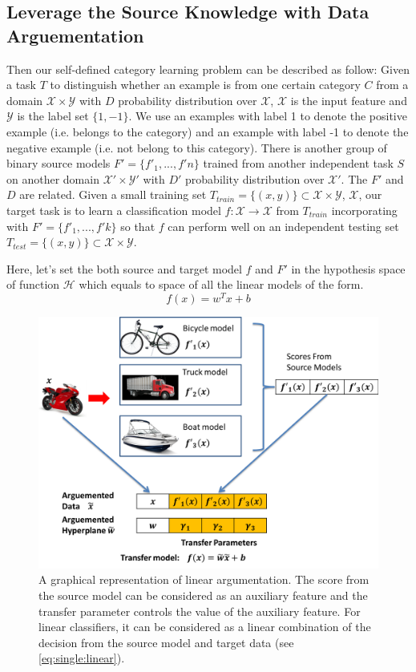 \subsection{Leverage the Source Knowledge with Data Arguementation}
Then our self-defined category learning problem can be described as follow: Given a task $T$ to distinguish whether an example is from one certain category $C$ from a domain $\mathcal{X} \times \mathcal{Y}$ with $D$ probability distribution over $\mathcal{X}$, $\mathcal{X}$ is the input feature and $\mathcal{Y}$ is the label set $\{1,-1\}$. We use an examples with label 1 to denote the positive example (i.e. belongs to the category) and an example with label -1 to denote the negative example (i.e. not belong to this category). There is another group of binary source models $F'=\{f'_{1},...,f'{n}\}$ trained from another independent task $S$ on another domain $\mathcal{X'} \times \mathcal{Y'}$ with $D'$ probability distribution over $\mathcal{X'}$. The $F'$ and $D$ are related. Given a small training set $T_{train}=\{(x,y)\} \subset \mathcal{X}\times \mathcal{Y}$, $\mathcal{X}$, our target task is to learn a classification model $f: \mathcal{X} \rightarrow \mathcal{X}$ from $T_{train}$ incorporating with $F'=\{f'_{1},...,f'{k}\}$ so that $f$ can perform well on an independent testing set $T_{test}=\{(x,y)\} \subset \mathcal{X} \times \mathcal{Y}$.

Here, let's set the both source and target model $f$ and $F'$ in the hypothesis space of function $\mathcal{H}$ which equals to space of all the linear models of the form. 
\begin{equation}
f(x)=w^Tx+b
\end{equation}
\begin{figure}
	\centering
	\includegraphics[scale=.7]{transfer/fig/argumentation.png}
	\caption{A graphical representation of linear argumentation. The score from the source model can be considered as an auxiliary feature and the transfer parameter controls the value of the auxiliary feature. For linear classifiers, it can be considered as a linear combination of the decision from the source model and target data (see \eqref{eq:single:linear}).}\label{fig:single:arg}
\end{figure}

